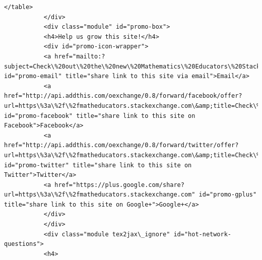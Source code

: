 \documentclass[11pt]{article}
\begin{document}
\begin{Verbatim}[commandchars=\\\{\}]
           </table>
           </div>
           <div class="module" id="promo-box">
           <h4>Help us grow this site!</h4>
           <div id="promo-icon-wrapper">
           <a href="mailto:?subject=Check\%20out\%20the\%20new\%20Mathematics\%20Educators\%20Stack\%20Exchange\%20Q\%26A\%20site\%20from\%20Stack\%20Exchange\&amp;body=Hi!\%0d\%0a\%0d\%0aI\%27m\%20supporting\%20a\%20new\%20Q\%26A\%20website\%20for\%20those\%20involved\%20in\%20the\%20field\%20of\%20teaching\%20mathematics.\%0d\%0a\%0d\%0aIt\%27s\%20built\%20on\%20the\%20same\%20software\%20as\%20stackoverflow.com\%2c\%20a\%20hugely\%20popular\%20site\%20where\%20over\%20seven\%20million\%20programmers\%20help\%20each\%20other\%20with\%20difficult\%20programming\%20problems.\%20On\%20Stack\%20Overflow\%20the\%20audience\%20votes\%20for\%20the\%20best\%20answer\%2c\%20so\%20the\%20answer\%20you\%20want\%20is\%20usually\%20right\%20at\%20the\%20top\%2c\%20not\%20on\%20page\%20five.\%0d\%0a\%0d\%0aI\%27m\%20hoping\%20that\%20a\%20site\%20for\%20those\%20involved\%20in\%20the\%20field\%20of\%20teaching\%20mathematics\%20would\%20have\%20the\%20same\%20kind\%20of\%20network\%20effect\%20and\%20turn\%20into\%20an\%20amazing\%20resource.\%0d\%0a\%0d\%0aThe\%20public\%20beta\%20is\%20going\%20on\%20here\%2c\%20if\%20you\%27re\%20interested\%20in\%20participating\%3a\%0d\%0a\%0d\%0ahttps\%3a\%2f\%2fmatheducators.stackexchange.com\%0d\%0a\%0d\%0aThanks!" id="promo-email" title="share link to this site via email">Email</a>
           <a href="http://api.addthis.com/oexchange/0.8/forward/facebook/offer?url=https\%3a\%2f\%2fmatheducators.stackexchange.com\&amp;title=Check\%20out\%20the\%20new\%20Mathematics\%20Educators\%20Stack\%20Exchange\%20Q\%26A\%20site\%20from\%20Stack\%20Exchange\&amp;username=stackoverflow" id="promo-facebook" title="share link to this site on Facebook">Facebook</a>
           <a href="http://api.addthis.com/oexchange/0.8/forward/twitter/offer?url=https\%3a\%2f\%2fmatheducators.stackexchange.com\&amp;title=Check\%20out\%20the\%20new\%20Mathematics\%20Educators\%20Stack\%20Exchange\%20QnA\%20site\%20from\%20\%40StackExchange\&amp;username=stackoverflow\&amp;template=\%7B\%7Btitle\%7D\%7D\%20\%7B\%7Burl\%7D\%7D" id="promo-twitter" title="share link to this site on Twitter">Twitter</a>
           <a href="https://plus.google.com/share?url=https\%3a\%2f\%2fmatheducators.stackexchange.com" id="promo-gplus" title="share link to this site on Google+">Google+</a>
           </div>
           </div>
           <div class="module tex2jax\_ignore" id="hot-network-questions">
           <h4>

\end{Verbatim}
\end{document}
